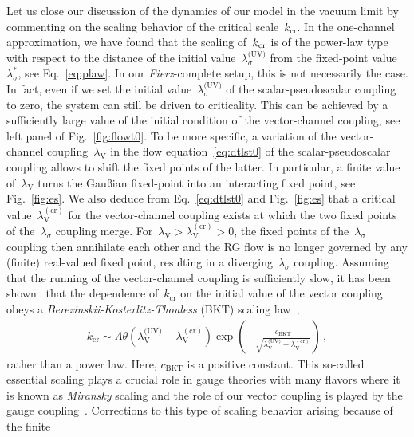 \documentclass[prd,english,preprintnumbers,amsmath,amssymb,nofootinbib,twocolumn,superscriptaddress]{revtex4-1}
\newcommand{\be}{\begin{eqnarray}}
\newcommand{\ee}{\end{eqnarray}}
\begin{document}
{Let us close our discussion of the dynamics of our model in the vacuum limit by commenting on the scaling behavior of the critical
scale~$k_{\text{cr}}$. In the one-channel approximation, we have
found that the scaling of~$k_{\rm cr}$ is of the power-law type with respect to the distance 
of the initial value~$\lambda_{\sigma}^{\text{(UV)}}$ from
the fixed-point value~$\lambda_{\sigma}^{\ast}$, see Eq.~\eqref{eq:plaw}. In our {\it Fierz}-complete setup, this is not necessarily the case. In fact, even
if we set the initial value~$\lambda_{\sigma}^{\text{(UV)}}$ of the scalar-pseudoscalar coupling to zero, the system can still be driven to criticality. This
can be achieved by a sufficiently {large value of the initial condition} of the vector-channel coupling, see left panel of Fig.~\ref{fig:flowt0}.
To be more specific, 
a variation of the vector-channel coupling~$\lambda_{\text{V}}$ in the flow equation~\eqref{eq:dtlst0} of the scalar-pseudoscalar coupling allows to shift
the fixed points of the latter. In particular, a finite value of~$\lambda_{\text{V}}$ turns the Gau\ss ian fixed-point into an interacting fixed point, see Fig.~\ref{fig:es}.
We also deduce from Eq.~\eqref{eq:dtlst0} 
and Fig.~\ref{fig:es} that a critical value~$\lambda_{\text{V}}^{(\text{cr})}$ for the vector-channel coupling 
exists at which the
two fixed points of the~$\lambda_{\sigma}$ coupling merge. For~$\lambda_{\text{V}} > \lambda_{\text{V}}^{(\text{cr})}>0$, the fixed points
of the~$\lambda_{\sigma}$ coupling then annihilate each other and the RG flow is no longer governed by any (finite) real-valued fixed point, resulting
in a diverging~$\lambda_{\sigma}$ coupling. Assuming that the running of the {vector-channel} coupling is sufficiently slow, 
it has been shown~\cite{Braun:2011pp} that the dependence 
of~$k_{\text{cr}}$ on the initial value of the vector coupling obeys a 
{\it Berezinskii-Kosterlitz-Thouless} (BKT) scaling law~\cite{Berezinskii,*Berezinskii2,*Kosterlitz:1973xp},
%
\be
\!\!\!\!\!\! k_{\text{cr}} \sim \Lambda \theta( \lambda_{\text{V}}^{\text{(UV)}}\!-\! \lambda_{\text{V}}^{(\text{cr})}) \exp\left({-\frac{c_{\text{BKT}}}{\sqrt{\lambda_{\text{V}}^{\text{(UV)}}\!-\! \lambda_{\text{V}}^{(\text{cr})}}} }\right)\,,
\ee
%
rather than a power law. Here, $c_{\text{BKT}}$ is a positive constant. 
This so-called essential scaling plays a crucial role in gauge theories with many flavors where it is known as {\it Miransky} scaling and the role of our vector coupling
is played by the gauge coupling~\cite{Miransky:1984ef,*Miransky:1988gk,*Miransky:1996pd}. Corrections to this type of scaling behavior arising because of the finite
}
\end{document}
